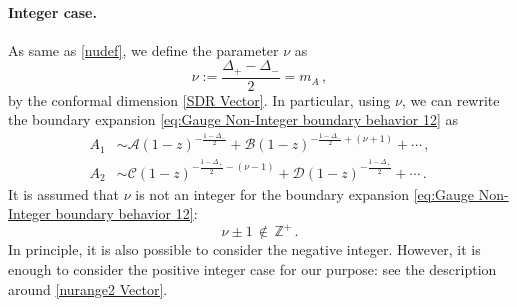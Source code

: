 \documentclass[11pt,a4paper]{article}
\begin{document}
\paragraph{Integer case.}
As same as \eqref{nudef}, we define the parameter $\nu$ as
\begin{equation}\label{nudef Gauge}
    \nu:=\frac{\Delta_+ - \Delta_-}{2}=m_A\,,
\end{equation}
by the conformal dimension \eqref{SDR Vector}. In particular, using $\nu$, we can rewrite the boundary expansion \eqref{eq:Gauge Non-Integer boundary behavior 12} as
\begin{equation}
\begin{aligned}
    A_1 &\sim \mathcal{A}(1-z)^{-\frac{1-\Delta_-}{2}} + \mathcal{B} (1-z)^{-\frac{1-\Delta_-}{2} + (\nu+1)} + \cdots\,,\\
    A_2 &\sim \mathcal{C}(1-z)^{-\frac{1-\Delta_+}{2}-(\nu-1)} + \mathcal{D} (1-z)^{-\frac{1-\Delta_+}{2}} + \cdots\,.
\end{aligned}
\end{equation}
It is assumed that $\nu$ is not an integer for the boundary expansion \eqref{eq:Gauge Non-Integer boundary behavior 12}:
\begin{equation}
    \nu \pm 1 \,\notin\, \mathbb{Z}^{+}\,.
\end{equation}
In principle, it is also possible to consider the negative integer. However, it is enough to consider the positive integer case for our purpose: see the description around \eqref{nurange2 Vector}.
\end{document}
